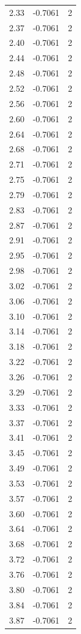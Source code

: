 \begin{longtable}{lrr}
  2.33 & -0.7061 & 2 \\
  2.37 & -0.7061 & 2 \\
  2.40 & -0.7061 & 2 \\
  2.44 & -0.7061 & 2 \\
  2.48 & -0.7061 & 2 \\
  2.52 & -0.7061 & 2 \\
  2.56 & -0.7061 & 2 \\
  2.60 & -0.7061 & 2 \\
  2.64 & -0.7061 & 2 \\
  2.68 & -0.7061 & 2 \\
  2.71 & -0.7061 & 2 \\
  2.75 & -0.7061 & 2 \\
  2.79 & -0.7061 & 2 \\
  2.83 & -0.7061 & 2 \\
  2.87 & -0.7061 & 2 \\
  2.91 & -0.7061 & 2 \\
  2.95 & -0.7061 & 2 \\
  2.98 & -0.7061 & 2 \\
  3.02 & -0.7061 & 2 \\
  3.06 & -0.7061 & 2 \\
  3.10 & -0.7061 & 2 \\
  3.14 & -0.7061 & 2 \\
  3.18 & -0.7061 & 2 \\
  3.22 & -0.7061 & 2 \\
  3.26 & -0.7061 & 2 \\
  3.29 & -0.7061 & 2 \\
  3.33 & -0.7061 & 2 \\
  3.37 & -0.7061 & 2 \\
  3.41 & -0.7061 & 2 \\
  3.45 & -0.7061 & 2 \\
  3.49 & -0.7061 & 2 \\
  3.53 & -0.7061 & 2 \\
  3.57 & -0.7061 & 2 \\
  3.60 & -0.7061 & 2 \\
  3.64 & -0.7061 & 2 \\
  3.68 & -0.7061 & 2 \\
  3.72 & -0.7061 & 2 \\
  3.76 & -0.7061 & 2 \\
  3.80 & -0.7061 & 2 \\
  3.84 & -0.7061 & 2 \\
  3.87 & -0.7061 & 2 \\

\end{longtable}
